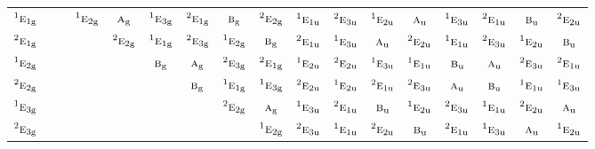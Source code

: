 \documentclass[10pt,a4paper]{article}
\numberwithin{equation}{section}
\newcommand{\irr}[1]{\text{\normalfont\scshape #1}}
\newcommand{\conjpair}[1]{{}^{#1}}
\newcommand{\ptag}[1]{\mathrm{#1}}
\begin{document}
{\begin{longtable}{@{}lcccccccccccccccc@{}}
$\conjpair{1}\irr{e}_{1\ptag{g}}$ &  &  & $\conjpair{1}\irr{e}_{2\ptag{g}}$ & $\irr{a}_{\ptag{g}}$ & $\conjpair{1}\irr{e}_{3\ptag{g}}$ & $\conjpair{2}\irr{e}_{1\ptag{g}}$ & $\irr{b}_{\ptag{g}}$ & $\conjpair{2}\irr{e}_{2\ptag{g}}$ & $\conjpair{1}\irr{e}_{1\ptag{u}}$ & $\conjpair{2}\irr{e}_{3\ptag{u}}$ & $\conjpair{1}\irr{e}_{2\ptag{u}}$ & $\irr{a}_{\ptag{u}}$ & $\conjpair{1}\irr{e}_{3\ptag{u}}$ & $\conjpair{2}\irr{e}_{1\ptag{u}}$ & $\irr{b}_{\ptag{u}}$ & $\conjpair{2}\irr{e}_{2\ptag{u}}$\\
$\conjpair{2}\irr{e}_{1\ptag{g}}$ &  &  &  & $\conjpair{2}\irr{e}_{2\ptag{g}}$ & $\conjpair{1}\irr{e}_{1\ptag{g}}$ & $\conjpair{2}\irr{e}_{3\ptag{g}}$ & $\conjpair{1}\irr{e}_{2\ptag{g}}$ & $\irr{b}_{\ptag{g}}$ & $\conjpair{2}\irr{e}_{1\ptag{u}}$ & $\conjpair{1}\irr{e}_{3\ptag{u}}$ & $\irr{a}_{\ptag{u}}$ & $\conjpair{2}\irr{e}_{2\ptag{u}}$ & $\conjpair{1}\irr{e}_{1\ptag{u}}$ & $\conjpair{2}\irr{e}_{3\ptag{u}}$ & $\conjpair{1}\irr{e}_{2\ptag{u}}$ & $\irr{b}_{\ptag{u}}$\\
$\conjpair{1}\irr{e}_{2\ptag{g}}$ &  &  &  &  & $\irr{b}_{\ptag{g}}$ & $\irr{a}_{\ptag{g}}$ & $\conjpair{2}\irr{e}_{3\ptag{g}}$ & $\conjpair{2}\irr{e}_{1\ptag{g}}$ & $\conjpair{1}\irr{e}_{2\ptag{u}}$ & $\conjpair{2}\irr{e}_{2\ptag{u}}$ & $\conjpair{1}\irr{e}_{3\ptag{u}}$ & $\conjpair{1}\irr{e}_{1\ptag{u}}$ & $\irr{b}_{\ptag{u}}$ & $\irr{a}_{\ptag{u}}$ & $\conjpair{2}\irr{e}_{3\ptag{u}}$ & $\conjpair{2}\irr{e}_{1\ptag{u}}$\\
$\conjpair{2}\irr{e}_{2\ptag{g}}$ &  &  &  &  &  & $\irr{b}_{\ptag{g}}$ & $\conjpair{1}\irr{e}_{1\ptag{g}}$ & $\conjpair{1}\irr{e}_{3\ptag{g}}$ & $\conjpair{2}\irr{e}_{2\ptag{u}}$ & $\conjpair{1}\irr{e}_{2\ptag{u}}$ & $\conjpair{2}\irr{e}_{1\ptag{u}}$ & $\conjpair{2}\irr{e}_{3\ptag{u}}$ & $\irr{a}_{\ptag{u}}$ & $\irr{b}_{\ptag{u}}$ & $\conjpair{1}\irr{e}_{1\ptag{u}}$ & $\conjpair{1}\irr{e}_{3\ptag{u}}$\\
$\conjpair{1}\irr{e}_{3\ptag{g}}$ &  &  &  &  &  &  & $\conjpair{2}\irr{e}_{2\ptag{g}}$ & $\irr{a}_{\ptag{g}}$ & $\conjpair{1}\irr{e}_{3\ptag{u}}$ & $\conjpair{2}\irr{e}_{1\ptag{u}}$ & $\irr{b}_{\ptag{u}}$ & $\conjpair{1}\irr{e}_{2\ptag{u}}$ & $\conjpair{2}\irr{e}_{3\ptag{u}}$ & $\conjpair{1}\irr{e}_{1\ptag{u}}$ & $\conjpair{2}\irr{e}_{2\ptag{u}}$ & $\irr{a}_{\ptag{u}}$\\
$\conjpair{2}\irr{e}_{3\ptag{g}}$ &  &  &  &  &  &  &  & $\conjpair{1}\irr{e}_{2\ptag{g}}$ & $\conjpair{2}\irr{e}_{3\ptag{u}}$ & $\conjpair{1}\irr{e}_{1\ptag{u}}$ & $\conjpair{2}\irr{e}_{2\ptag{u}}$ & $\irr{b}_{\ptag{u}}$ & $\conjpair{2}\irr{e}_{1\ptag{u}}$ & $\conjpair{1}\irr{e}_{3\ptag{u}}$ & $\irr{a}_{\ptag{u}}$ & $\conjpair{1}\irr{e}_{2\ptag{u}}$\\

\end{longtable}}
\end{document}

